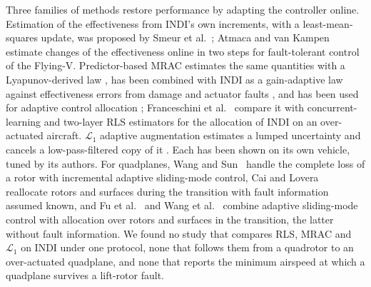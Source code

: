 \documentclass[preprint,12pt,a4paper]{elsarticle}
\begin{document}
Three families of methods restore performance by adapting the controller online. Estimation of the
effectiveness from INDI's own increments, with a least-mean-squares update, was proposed by Smeur et al.~\cite{smeur2016}; Atmaca and van Kampen~\cite{atmaca2025} estimate changes of the
effectiveness online in two steps for fault-tolerant control of the Flying-V. Predictor-based MRAC estimates the same
quantities with a Lyapunov-derived law \cite{lavretsky2013}, has been combined with INDI as a gain-adaptive law against
effectiveness errors from damage and actuator faults \cite{chang2022}, and has been used for adaptive control allocation \cite{falconi2021,franceschini2026}; Franceschini et al.~\cite{franceschini2026}
compare it with concurrent-learning and two-layer RLS estimators for the allocation of INDI on an over-actuated aircraft.
$\mathcal{L}_1$ adaptive augmentation estimates a lumped uncertainty and cancels a low-pass-filtered copy of it
\cite{hovakimyan2010,raos2026,mao2023}. Each has been shown on its own vehicle, tuned by its authors. For quadplanes,
Wang and Sun~\cite{wang2021} handle the complete loss of a rotor with incremental adaptive sliding-mode control, Cai and Lovera~\cite{cai2025} reallocate
rotors and surfaces during the transition with fault information assumed known, and Fu et al.~\cite{fu2025} and Wang et al.~\cite{wangban2023} combine adaptive sliding-mode control with allocation
over rotors and surfaces in the transition, the latter without fault information. We found no study that compares RLS, MRAC and $\mathcal{L}_1$ on INDI
under one protocol, none that follows them from a quadrotor to an over-actuated quadplane, and none that reports the minimum
airspeed at which a quadplane survives a lift-rotor fault.
\end{document}
